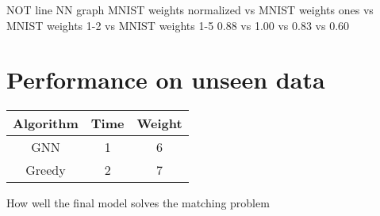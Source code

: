 NOT line NN graph MNIST weights normalized vs MNIST weights ones vs MNIST weights 1-2 vs MNIST weights 1-5
0.88 vs 1.00  vs 0.83 vs 0.60

\section{Performance on unseen data}

\begin{center}
\begin{tabular}{||c c c||} 
 \hline
 Algorithm & Time & Weight \\ [0.5ex] 
 \hline\hline
 GNN & 1 & 6 \\ 
 \hline
 Greedy & 2 & 7 \\ [1ex] 
 \hline
\end{tabular}
\end{center}

How well the final model solves the matching problem